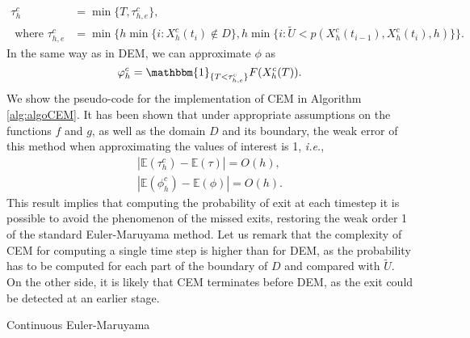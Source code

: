 \begin{equation}\label{eq:TauCEM}
\begin{aligned}
	\tau_h^c &= \min \{T,\tau_{h,e}^c\}, \\
	\text{ where } \tau_{h,e}^c &= \min\{h\min\{i \colon X_h^c(t_i) \notin D\}, h\min\{i \colon \tilde U < p(X_h^c(t_{i-1}),X_h^c(t_i),h) \}\}.
\end{aligned}
\end{equation}
In the same way as in DEM, we can approximate $\phi$ as
\begin{equation}\label{eq:PhiCEM}
	\phi_h^c = \mathbbm{1}_{\{T < \tau_{h,e}^c\}}F(X_h^c(T)).
\end{equation}
We show the pseudo-code for the implementation of CEM in Algorithm \ref{alg:algoCEM}. It has been shown \cite{Gobet2010} that under appropriate assumptions on the functions $f$ and $g$, as well as the domain $D$ and its boundary, the weak error of this method when approximating the values of interest is 1, \textit{i.e.},
\begin{align}\label{eq:ConvCEMPhi}
	|\mathbb{E}(\tau_h^c) - \mathbb{E}(\tau)| = O(h), \\
	|\mathbb{E}(\phi_h^c) - \mathbb{E}(\phi)| = O(h).
\end{align}
This result implies that computing the probability of exit at each timestep it is possible to avoid the phenomenon of the missed exits, restoring the weak order 1 of the standard Euler-Maruyama method. Let us remark that the complexity of CEM for computing a single time step is higher than for DEM, as the probability has to be computed for each part of the boundary of $D$ and compared with $\tilde U$. On the other side, it is likely that CEM terminates before DEM, as the exit could be detected at an earlier stage.

\begin{algorithm}[t]
\caption{Continuous Euler-Maruyama}
\label{alg:algoCEM}
\end{algorithm}



